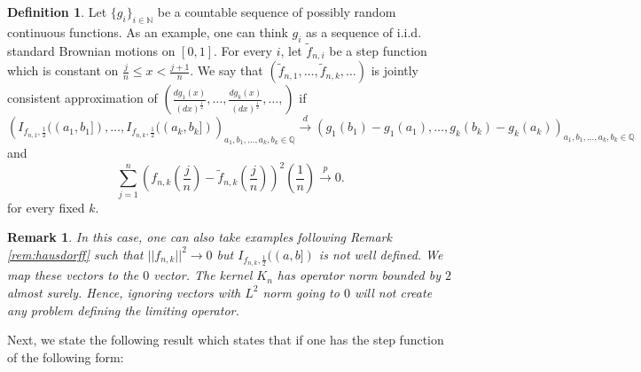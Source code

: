 \documentclass[reqno,12pt]{amsart}
\theoremstyle{plain}
\newtheorem{remark}{Remark}
\theoremstyle{definition}
\newtheorem{definition}{Definition}
\let\tilde\widetilde
\begin{document}
\begin{definition}\label{def:conII}
Let $\{g_{i}\}_{i \in \mathbb{N}}$ be a countable sequence of possibly random continuous functions. As an example, one can think $g_{i}$ as a sequence of i.i.d. standard Brownian motions on $[0,1]$. For every $i$, let $\tilde{f}_{n,i}$ be a step function which is constant on $\frac{j}{n}\le x < \frac{j+1}{n}$. We say that $\left(\tilde{f}_{n,1},\ldots, \tilde{f}_{n,k},\ldots\right)$ is  jointly  consistent approximation of $\left(\frac{dg_{1}(x)}{(dx)^{\frac{1}{2}}},\ldots, \frac{dg_{k}(x)}{(dx)^{\frac{1}{2}}},\ldots,\right)$ if 
\[
\left( I_{f_{n,1},\frac{1}{2}}((a_{1},b_{1}]),\ldots, I_{f_{n,k},\frac{1}{2}}((a_{k},b_{k}]) \right)_{a_{1},b_{1},\ldots, a_{k},b_{k} \in \mathbb{Q}} \stackrel{d}{\to} \left( g_{1}(b_{1})-g_{1}(a_{1}),\ldots, g_{k}(b_{k})- g_{k}(a_{k})  \right)_{a_{1},b_{1},\ldots, a_{k},b_{k} \in \mathbb{Q}}
\]
and 
\[
\sum_{j=1}^{n} \left( f_{n,k}\left( \frac{j}{n}\right) - \tilde{f}_{n,k} \left( \frac{j}{n} \right)\right)^{2} \left( \frac{1}{n} \right) \stackrel{p}{\to} 0.
\]
for every fixed $k$.
\end{definition}
\begin{remark}\label{rem:boundedzero}
    In this case, one can also take examples following Remark \ref{rem:hausdorff} such that $||f_{n,k}||^{2} \to 0$ but $I_{f_{n,k},\frac{1}{2}}((a,b])$ is not well defined. We map these vectors to the $0$ vector. The kernel $K_{n}$ has operator norm bounded by $2$ almost surely. Hence, ignoring vectors with $L^{2}$ norm going to $0$ will not create any problem defining the limiting operator.
\end{remark}
Next, we state the following result which states that if one has the step function of the following form:
\end{document}
